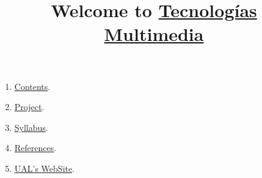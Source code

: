 
%
\title{Welcome to \href{https://github.com/Tecnologiaas-Multimedia}{Tecnologías Multimedia}}

\maketitle

\begin{enumerate}
\item \href{https://tecnologias-multimedia.github.io/contents}{Contents}.
\item \href{https://github.com/Tecnologias-Multimedia/InterCom}{Project}.
\item \href{https://tecnologias-multimedia.github.io/syllabus}{Syllabus}.
\item \href{https://tecnologias-multimedia.github.io/references}{References}.
\item \href{https://www.ual.es/estudios/grados/presentacion/plandeestudios/asignatura/4015/40154321}{UAL's WebSite}.
\end{enumerate}
